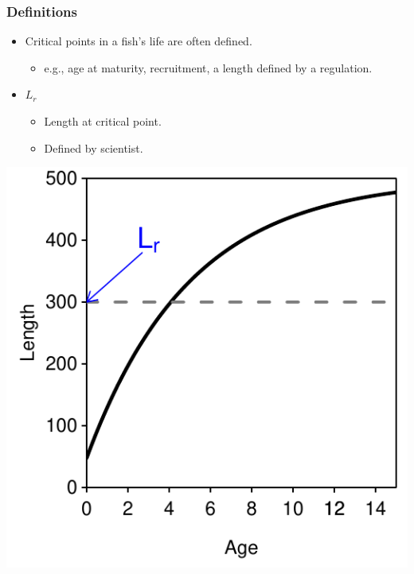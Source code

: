 \documentclass[xcolor=dvipsnames]{beamer}\usepackage[]{graphicx}\usepackage[]{color}
\newenvironment{knitrout}{}{} %
\begin{document}
\begin{frame}[fragile, t]
\frametitle{Definitions}
\begin{itemize}
  \item Critical points in a fish's life are often defined.
  \begin{itemize}
    \item e.g., age at maturity, recruitment, a length defined by a regulation.
  \end{itemize}
\end{itemize}
\pause
\smallskip
\begin{minipage}[t]{0.6\textwidth}
  \begin{itemize}
    \item $L_{r}$
    \begin{itemize}
      \item Length at critical point.
      \item Defined by scientist.
    \end{itemize}
  \end{itemize}
\end{minipage}%
\hspace*{-2cm}
\begin{minipage}[t]{0.7\textwidth}
\begin{knitrout}\footnotesize
{}\color{fgcolor}

{\centering \includegraphics[width=.6\linewidth]{Figs/defn1-1} 

}



\end{knitrout}
\end{minipage}%
\end{frame}
\end{document}
